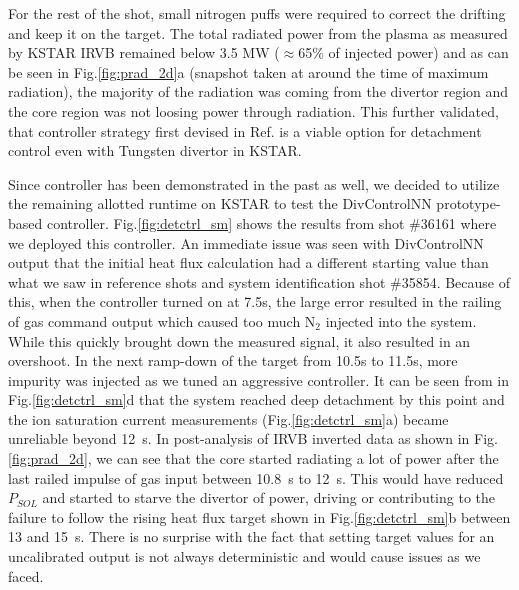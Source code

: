 For the rest of the shot, small nitrogen puffs were required to correct the drifting \Afrac and keep it on the target.
The total radiated power from the plasma as measured by KSTAR \ac{IRVB} remained below 3.5 MW ($\approx$65\% of injected power) and as can be seen in Fig.\ref{fig:prad_2d}a (snapshot taken at around the time of maximum radiation), the majority of the radiation was coming from the divertor region and the core region was not loosing power through radiation.
This further validated, that \Afrac controller strategy first devised in Ref.\cite{Eldon_2022_PPCF} is a viable option for detachment control even with Tungsten divertor in KSTAR.

Since \Afrac controller has been demonstrated in the past as well, we decided to utilize the remaining allotted runtime on KSTAR to test the DivControlNN prototype-based controller.
Fig.\ref{fig:detctrl_sm} shows the results from shot \#36161 where we deployed this controller.
An immediate issue was seen with DivControlNN output that the initial heat flux calculation had a different starting value than what we saw in reference shots and system identification shot \#35854.
Because of this, when the controller turned on at 7.5s, the large error resulted in the railing of gas command output which caused too much N$_2$ injected into the system.
While this quickly brought down the measured signal, it also resulted in an overshoot.
In the next ramp-down of the target from 10.5s to 11.5s, more impurity was injected as we tuned an aggressive controller.
It can be seen from \Afrac in Fig.\ref{fig:detctrl_sm}d that the system reached deep detachment by this point and the ion saturation current measurements (Fig.\ref{fig:detctrl_sm}a) became unreliable beyond 12~s.
In post-analysis of IRVB inverted data as shown in Fig.\ref{fig:prad_2d}, we can see that the core started radiating a lot of power after the last railed impulse of gas input between 10.8~s to 12~s.
This would have reduced $P_{SOL}$ and started to starve the divertor of power, driving or contributing to the failure to follow the rising heat flux target shown in Fig.\ref{fig:detctrl_sm}b between 13 and 15~s.
There is no surprise with the fact that setting target values for an uncalibrated output is not always deterministic and would cause issues as we faced.

